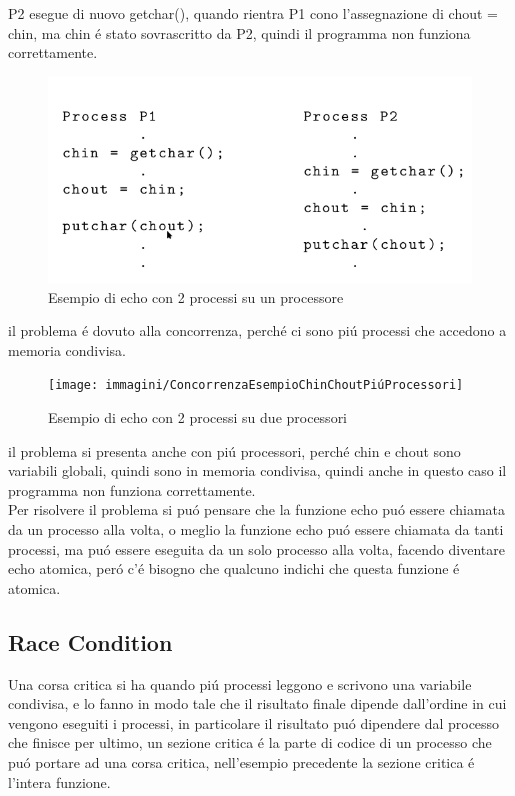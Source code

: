 P2 esegue di nuovo getchar(), quando rientra P1 cono l'assegnazione di chout = chin, ma chin é stato sovrascritto da P2, quindi il programma non funziona correttamente.
\begin{figure}[H]
    \centering
    \includegraphics[width=0.5\linewidth]{immagini/ConcorrenzaEsempioChinChoutUnProcessore}
    \caption{Esempio di echo con 2 processi su un processore}
\end{figure}
il problema é dovuto alla concorrenza, perché ci sono piú processi che accedono a memoria condivisa.
\begin{figure}[H]
    \centering
    \texttt{[image: immagini/ConcorrenzaEsempioChinChoutPiúProcessori]}
    \caption{Esempio di echo con 2 processi su due processori}
\end{figure}
il problema si presenta anche con piú processori, perché chin e chout sono variabili globali, quindi sono in memoria condivisa, quindi anche in questo caso il programma non funziona correttamente.\\
\newline
Per risolvere il problema si puó  pensare che la funzione echo puó essere chiamata da un processo alla volta, o meglio la funzione echo
puó essere chiamata da tanti processi, ma puó essere eseguita da un solo processo alla volta, facendo diventare echo atomica, peró c'é bisogno che qualcuno indichi che
questa funzione é atomica.
\subsection{Race Condition}
Una corsa critica si ha quando piú processi leggono e scrivono una variabile condivisa, e lo fanno in modo tale che il risultato finale dipende dall'ordine in cui vengono eseguiti i processi,
in particolare il risultato puó dipendere dal processo che finisce per ultimo, un sezione critica é la parte di codice di un processo che puó portare ad una corsa critica, nell'esempio 
precedente la sezione critica é l'intera funzione.
